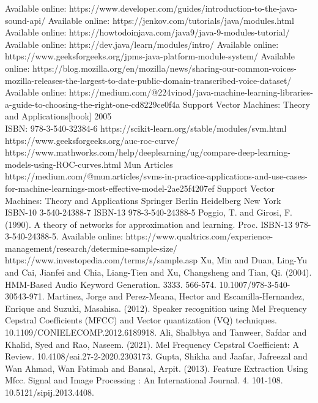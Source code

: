 \documentclass[english,12pt,oneside,a4paper]{article}
\begin{document}
\begin{thebibliography}{15}
		Available online: https://www.developer.com/guides/introduction-to-the-java-sound-api/
		Available online:
		https://jenkov.com/tutorials/java/modules.html
		Available online:
		https://howtodoinjava.com/java9/java-9-modules-tutorial/
		Available online:
		https://dev.java/learn/modules/intro/
		Available online:
		https://www.geeksforgeeks.org/jpms-java-platform-module-system/
		Available online:
		https://blog.mozilla.org/en/mozilla/news/sharing-our-common-voices-mozilla-releases-the-largest-to-date-public-domain-transcribed-voice-dataset/
		Available online:
		https://medium.com/@224vinod/java-machine-learning-libraries-a-guide-to-choosing-the-right-one-cd8229ce0f4a
		Support Vector Machines: Theory and Applications[book] 2005 \\ISBN: 978-3-540-32384-6
		https://scikit-learn.org/stable/modules/svm.html
		https://www.geeksforgeeks.org/auc-roc-curve/
		https://www.mathworks.com/help/deeplearning/ug/compare-deep-learning-models-using-ROC-curves.html
		Mun Articles  https://medium.com/@mun.articles/svms-in-practice-applications-and-use-cases-for-machine-learnings-most-effective-model-2ae25f4207ef
		Support Vector Machines: Theory and Applications Springer Berlin Heidelberg New York \\ ISBN-10 3-540-24388-7 ISBN-13 978-3-540-24388-5
		Poggio, T. and Girosi, F. (1990). A theory of networks for approximation and
		learning. Proc. ISBN-13 978-3-540-24388-5.
		Available online:
		https://www.qualtrics.com/experience-management/research/determine-sample-size/
		https://www.investopedia.com/terms/s/sample.asp
		Xu, Min and Duan, Ling-Yu and Cai, Jianfei and Chia, Liang-Tien and Xu, Changsheng and Tian, Qi. (2004). HMM-Based Audio Keyword Generation. 3333. 566-574. 10.1007/978-3-540-30543-971.
		Martinez, Jorge and Perez-Meana, Hector and Escamilla-Hernandez, Enrique and Suzuki, Masahisa. (2012). Speaker recognition using Mel Frequency Cepstral Coefficients (MFCC) and Vector quantization (VQ) techniques. 10.1109/CONIELECOMP.2012.6189918. 
		Ali, Shalbbya and Tanweer, Safdar and Khalid, Syed and Rao, Naseem. (2021). Mel Frequency Cepstral Coefficient: A Review. 10.4108/eai.27-2-2020.2303173. 
		Gupta, Shikha and Jaafar, Jafreezal and Wan Ahmad, Wan Fatimah and Bansal, Arpit. (2013). Feature Extraction Using Mfcc. Signal and Image Processing : An International Journal. 4. 101-108. 10.5121/sipij.2013.4408. 

\end{thebibliography}
\end{document}
